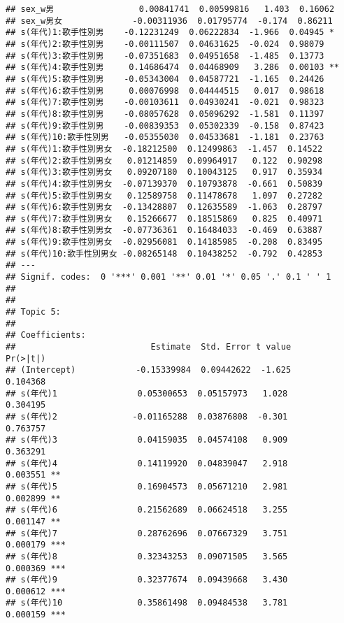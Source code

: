 \documentclass[
]{article}
\begin{document}
\begin{verbatim}
## sex_w男                 0.00841741  0.00599816   1.403  0.16062   
## sex_w男女              -0.00311936  0.01795774  -0.174  0.86211   
## s(年代)1:歌手性別男    -0.12231249  0.06222834  -1.966  0.04945 * 
## s(年代)2:歌手性別男    -0.00111507  0.04631625  -0.024  0.98079   
## s(年代)3:歌手性別男    -0.07351683  0.04951658  -1.485  0.13773   
## s(年代)4:歌手性別男     0.14686474  0.04468909   3.286  0.00103 **
## s(年代)5:歌手性別男    -0.05343004  0.04587721  -1.165  0.24426   
## s(年代)6:歌手性別男     0.00076998  0.04444515   0.017  0.98618   
## s(年代)7:歌手性別男    -0.00103611  0.04930241  -0.021  0.98323   
## s(年代)8:歌手性別男    -0.08057628  0.05096292  -1.581  0.11397   
## s(年代)9:歌手性別男    -0.00839353  0.05302339  -0.158  0.87423   
## s(年代)10:歌手性別男   -0.05355030  0.04533681  -1.181  0.23763   
## s(年代)1:歌手性別男女  -0.18212500  0.12499863  -1.457  0.14522   
## s(年代)2:歌手性別男女   0.01214859  0.09964917   0.122  0.90298   
## s(年代)3:歌手性別男女   0.09207180  0.10043125   0.917  0.35934   
## s(年代)4:歌手性別男女  -0.07139370  0.10793878  -0.661  0.50839   
## s(年代)5:歌手性別男女   0.12589758  0.11478678   1.097  0.27282   
## s(年代)6:歌手性別男女  -0.13428807  0.12635589  -1.063  0.28797   
## s(年代)7:歌手性別男女   0.15266677  0.18515869   0.825  0.40971   
## s(年代)8:歌手性別男女  -0.07736361  0.16484033  -0.469  0.63887   
## s(年代)9:歌手性別男女  -0.02956081  0.14185985  -0.208  0.83495   
## s(年代)10:歌手性別男女 -0.08265148  0.10438252  -0.792  0.42853   
## ---
## Signif. codes:  0 '***' 0.001 '**' 0.01 '*' 0.05 '.' 0.1 ' ' 1
## 
## 
## Topic 5:
## 
## Coefficients:
##                           Estimate  Std. Error t value            Pr(>|t|)    
## (Intercept)            -0.15339984  0.09442622  -1.625            0.104368    
## s(年代)1                0.05300653  0.05157973   1.028            0.304195    
## s(年代)2               -0.01165288  0.03876808  -0.301            0.763757    
## s(年代)3                0.04159035  0.04574108   0.909            0.363291    
## s(年代)4                0.14119920  0.04839047   2.918            0.003551 ** 
## s(年代)5                0.16904573  0.05671210   2.981            0.002899 ** 
## s(年代)6                0.21562689  0.06624518   3.255            0.001147 ** 
## s(年代)7                0.28762696  0.07667329   3.751            0.000179 ***
## s(年代)8                0.32343253  0.09071505   3.565            0.000369 ***
## s(年代)9                0.32377674  0.09439668   3.430            0.000612 ***
## s(年代)10               0.35861498  0.09484538   3.781            0.000159 ***

\end{verbatim}
\end{document}
